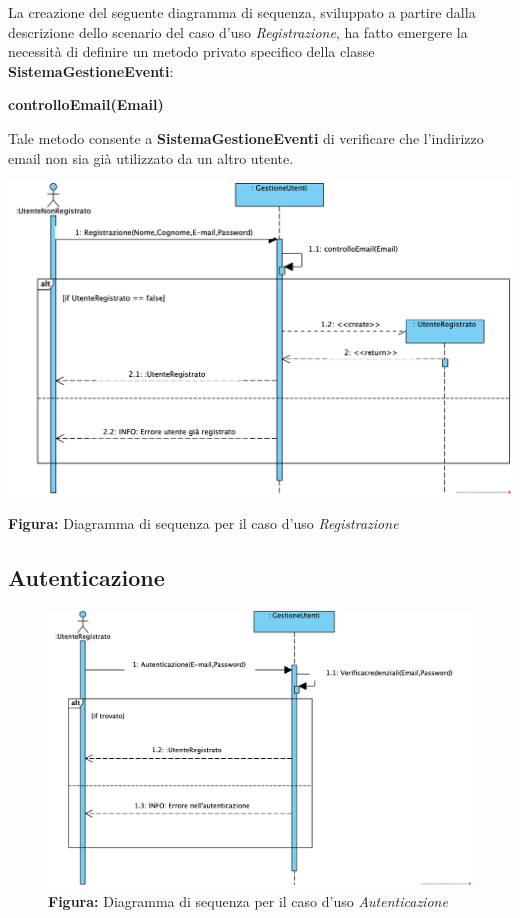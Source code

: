 \begin{center}
    La creazione del seguente diagramma di sequenza, sviluppato a partire dalla descrizione dello scenario del caso d’uso \textit{Registrazione}, ha fatto emergere la necessità di definire un metodo privato specifico della classe \textbf{SistemaGestioneEventi}:

    \vspace{1ex}
    \textbf{controlloEmail(Email)}

    \vspace{2ex}
    Tale metodo consente a \textbf{SistemaGestioneEventi} di verificare che l’indirizzo email  non sia già utilizzato da un altro utente.

    \vspace{3ex}
    \includegraphics[width=0.8\linewidth]{assets/casid'uso/Registrazione.png}
    
    \vspace{1ex}
    \textbf{Figura:} Diagramma di sequenza per il caso d’uso \textit{Registrazione}
\end{center}

\subsection{Autenticazione}
\begin{figure}[!ht]
    \hspace*{4cm} %
    \includegraphics[width=0.8\linewidth]{assets/casid'uso/Autenticazione.png}
	\vspace{1ex}
    \textbf{Figura:} Diagramma di sequenza per il caso d’uso \textit{Autenticazione}
\end{figure}

